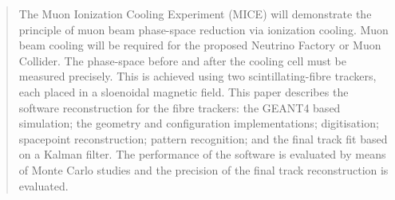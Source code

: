 \begin{quotation}

\noindent
The Muon Ionization Cooling Experiment (MICE) will demonstrate the principle of muon beam phase-space reduction via ionization cooling.  Muon beam cooling will be required for the proposed Neutrino Factory or Muon Collider.  The phase-space before and after the cooling cell must be measured precisely. This is achieved using two scintillating-fibre trackers, each placed in a sloenoidal magnetic field.  This paper describes the software reconstruction for the fibre trackers: the GEANT4 based simulation; the geometry and configuration implementations; digitisation; spacepoint reconstruction; pattern recognition; and the final track fit based on a Kalman filter. The performance of the software is evaluated by means of Monte Carlo studies and the precision of the final track reconstruction is evaluated.

\end{quotation}
